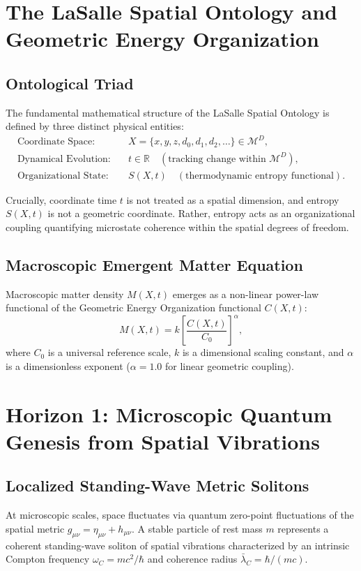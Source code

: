 \documentclass[11pt,a4paper]{article}
\begin{document}
\section{The LaSalle Spatial Ontology and Geometric Energy Organization}

\subsection{Ontological Triad}
The fundamental mathematical structure of the LaSalle Spatial Ontology is defined by three distinct physical entities:
\begin{equation}
\begin{aligned}
\text{Coordinate Space:} \quad & X = \{x, y, z, d_0, d_1, d_2, \dots\} \in \mathcal{M}^D, \\
\text{Dynamical Evolution:} \quad & t \in \mathbb{R} \quad (\text{tracking change within } \mathcal{M}^D), \\
\text{Organizational State:} \quad & S(X,t) \quad (\text{thermodynamic entropy functional}).
\end{aligned}
\end{equation}

Crucially, coordinate time $t$ is not treated as a spatial dimension, and entropy $S(X,t)$ is not a geometric coordinate. Rather, entropy acts as an organizational coupling quantifying microstate coherence within the spatial degrees of freedom.

\subsection{Macroscopic Emergent Matter Equation}
Macroscopic matter density $M(X,t)$ emerges as a non-linear power-law functional of the Geometric Energy Organization functional $C(X,t)$:
\begin{equation}
M(X,t) = k \left[ \frac{C(X,t)}{C_0} \right]^\alpha,
\end{equation}
where $C_0$ is a universal reference scale, $k$ is a dimensional scaling constant, and $\alpha$ is a dimensionless exponent ($\alpha = 1.0$ for linear geometric coupling).

\section{Horizon 1: Microscopic Quantum Genesis from Spatial Vibrations}

\subsection{Localized Standing-Wave Metric Solitons}
At microscopic scales, space fluctuates via quantum zero-point fluctuations of the spatial metric $g_{\mu\nu} = \eta_{\mu\nu} + h_{\mu\nu}$. A stable particle of rest mass $m$ represents a coherent standing-wave soliton of spatial vibrations characterized by an intrinsic Compton frequency $\omega_C = m c^2 / \hbar$ and coherence radius $\bar{\lambda}_C = \hbar / (m c)$.
\end{document}
